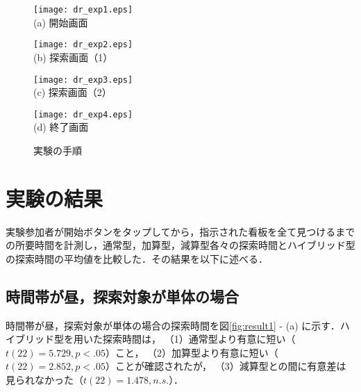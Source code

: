   \begin{figure}[t]
    \begin{minipage}{0.49\hsize}
        \begin{center}
            \texttt{[image: dr\_exp1.eps]}\\
            \small{(a) 開始画面}
        \end{center}
    \end{minipage}
    \begin{minipage}{0.49\hsize}
        \begin{center}
            \texttt{[image: dr\_exp2.eps]}\\
            \small{(b) 探索画面（1）}
        \end{center}
    \end{minipage}
    \begin{minipage}{0.49\hsize}
        \begin{center}
            \texttt{[image: dr\_exp3.eps]}\\
            \small{(c) 探索画面（2）}
        \end{center}
    \end{minipage}
    \begin{minipage}{0.49\hsize}
        \begin{center}
            \texttt{[image: dr\_exp4.eps]}\\
            \small{(d) 終了画面}
        \end{center}
    \end{minipage}
    \vspace{1pt}
    \caption{実験の手順}
    \label{fig:experiment}
  \end{figure}

\section{実験の結果}
  実験参加者が開始ボタンをタップしてから，指示された看板を全て見つけるまでの所要時間を計測し，通常型，加算型，減算型各々の探索時間とハイブリッド型の探索時間の平均値を比較した．その結果を以下に述べる．
  \subsection{時間帯が昼，探索対象が単体の場合}
    時間帯が昼，探索対象が単体の場合の探索時間を図\ref{fig:result1} - (a) に示す．ハイブリッド型を用いた探索時間は，
    （1）通常型より有意に短い（$t(22)=5.729,p<.05$）こと，
    （2）加算型より有意に短い（$t(22)=2.852,p<.05$）ことが確認されたが，
    （3）減算型との間に有意差は見られなかった（$t(22)=1.478,n.s.$）．

